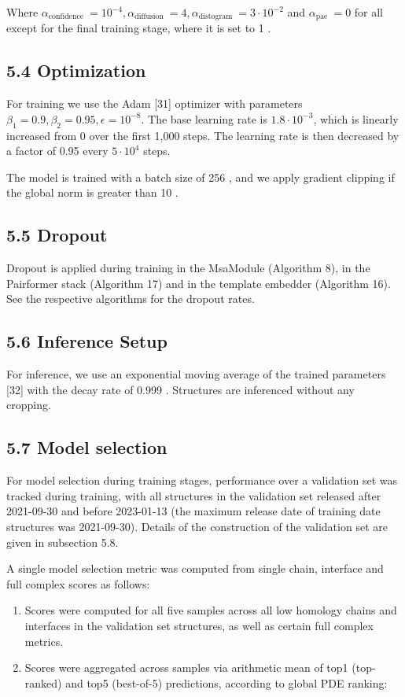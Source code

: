 \documentclass[10pt]{article}
\begin{document}
Where $\alpha_{\text {confidence }}=10^{-4}, \alpha_{\text {diffusion }}=4, \alpha_{\text {distogram }}=3 \cdot 10^{-2}$ and $\alpha_{\text {pae }}=0$ for all except for the final training stage, where it is set to 1 .

\subsection*{5.4 Optimization}
For training we use the Adam [31] optimizer with parameters $\beta_{1}=0.9, \beta_{2}=0.95, \epsilon=10^{-8}$. The base learning rate is $1.8 \cdot 10^{-3}$, which is linearly increased from 0 over the first 1,000 steps. The learning rate is then decreased by a factor of 0.95 every $5 \cdot 10^{4}$ steps.

The model is trained with a batch size of 256 , and we apply gradient clipping if the global norm is greater than 10 .

\subsection*{5.5 Dropout}
Dropout is applied during training in the MsaModule (Algorithm 8), in the Pairformer stack (Algorithm 17) and in the template embedder (Algorithm 16). See the respective algorithms for the dropout rates.

\subsection*{5.6 Inference Setup}
For inference, we use an exponential moving average of the trained parameters [32] with the decay rate of 0.999 . Structures are inferenced without any cropping.

\subsection*{5.7 Model selection}
For model selection during training stages, performance over a validation set was tracked during training, with all structures in the validation set released after 2021-09-30 and before 2023-01-13 (the maximum release date of training date structures was 2021-09-30). Details of the construction of the validation set are given in subsection 5.8.

A single model selection metric was computed from single chain, interface and full complex scores as follows:

\begin{enumerate}
  \item Scores were computed for all five samples across all low homology chains and interfaces in the validation set structures, as well as certain full complex metrics.
  \item Scores were aggregated across samples via arithmetic mean of top1 (top-ranked) and top5 (best-of-5) predictions, according to global PDE ranking:
\end{enumerate}
\end{document}

